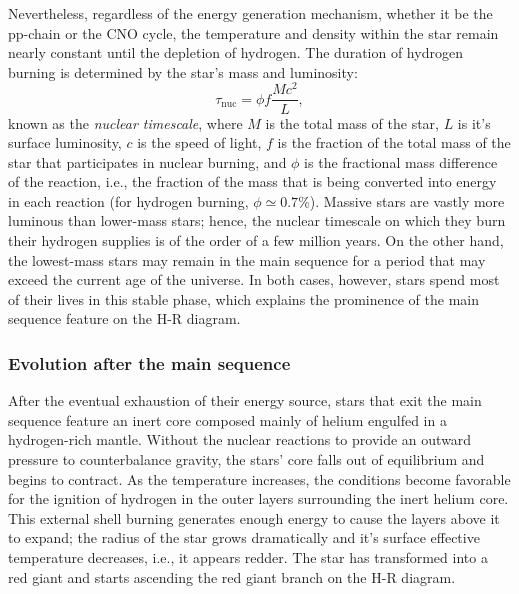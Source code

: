 \documentclass[main.tex]{subfiles}
\begin{document}
    Nevertheless, regardless of the energy generation mechanism, whether it be the pp-chain or the CNO cycle, the temperature and density within the star remain nearly constant until the depletion of hydrogen. The duration of hydrogen burning is determined by the star's mass and luminosity:
    \begin{equation}
        \label{eq:nuclear_timescale}
        \tau_\mathrm{nuc} = \phi f \frac{Mc^2}{L},
    \end{equation}
    known as the \textit{nuclear timescale}, where $M$ is the total mass of the star, $L$ is it's surface luminosity, $c$ is the speed of light, $f$ is the fraction of the total mass of the star that participates in nuclear burning, and $\phi$ is the fractional mass difference of the reaction, i.e., the fraction of the mass that is being converted into energy in each reaction (for hydrogen burning, $\phi \simeq 0.7\%$). Massive stars are vastly more luminous than lower-mass stars; hence, the nuclear timescale on which they burn their hydrogen supplies is of the order of a few million years. On the other hand, the lowest-mass stars may remain in the main sequence for a period that may exceed the current age of the universe. In both cases, however, stars spend most of their lives in this stable phase, which explains the prominence of the main sequence feature on the H-R diagram.
    


    \subsubsection{Evolution after the main sequence}
    After the eventual exhaustion of their energy source, stars that exit the main sequence feature an inert core composed mainly of helium engulfed in a hydrogen-rich mantle. Without the nuclear reactions to provide an outward pressure to counterbalance gravity, the stars' core falls out of equilibrium and begins to contract. As the temperature increases, the conditions become favorable for the ignition of hydrogen in the outer layers surrounding the inert helium core. This external shell burning generates enough energy to cause the layers above it to expand; the radius of the star grows dramatically and it's surface effective temperature decreases, i.e., it appears redder. The star has transformed into a red giant and starts ascending the red giant branch on the H-R diagram.
\end{document}
